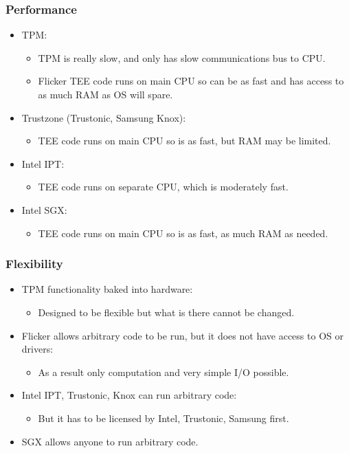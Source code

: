 \documentclass{beamer}
\begin{document}
\begin{frame}
    \frametitle{Performance}
    \begin{itemize}
        \item TPM:
        \begin{itemize}
            \item TPM is really slow, and only has slow communications bus to CPU.
            \item Flicker TEE code runs on main CPU so can be as fast and has access to as much RAM as OS will spare.
        \end{itemize}
        \vfill
        \item Trustzone (Trustonic, Samsung Knox):
        \begin{itemize}
            \item TEE code runs on main CPU so is as fast, but RAM may be limited.
        \end{itemize}
        \vfill
        \item Intel IPT:
        \begin{itemize}
            \item TEE code runs on separate CPU, which is moderately fast.
        \end{itemize}
        \vfill
        \item Intel SGX:
        \begin{itemize}
            \item TEE code runs on main CPU so is as fast, as much RAM as needed.
        \end{itemize}
    \end{itemize}
\end{frame}

\begin{frame}
    \frametitle{Flexibility}

    \begin{itemize}
        \item TPM functionality baked into hardware:
        \begin{itemize}
            \item Designed to be flexible but what is there cannot be changed.
        \end{itemize}
        \vfill
        \item Flicker allows arbitrary code to be run, but it does not have access to OS or drivers:
        \begin{itemize}
            \item As a result only computation and very simple I/O possible.
        \end{itemize}
        \vfill
        \item Intel IPT, Trustonic, Knox can run arbitrary code:
        \begin{itemize}
            \item But it has to be licensed by Intel, Trustonic, Samsung first.
        \end{itemize}
        \vfill
        \item SGX allows anyone to run arbitrary code.
    \end{itemize}
\end{frame}
\end{document}
